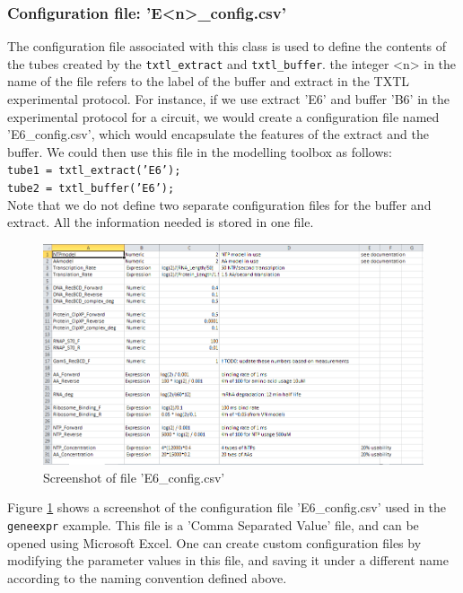 \documentclass[english]{report}
\begin{document}
		\subsubsection*{Configuration file: \textsf{'E<n>\_config.csv'}}
		The configuration file associated with this class is used to define the contents of the tubes created by the \texttt{txtl\_extract} and \texttt{txtl\_buffer}. the integer <n> in the name of the file refers to the label of the buffer and extract in the TXTL experimental protocol. For instance, if we use extract \textsf{'E6'} and buffer \textsf{'B6'} in the experimental protocol for a circuit, we would create a configuration file named \textsf{'E6\_config.csv'}, which would encapsulate the features of the extract and the buffer. We could then use this file in the modelling toolbox as follows: \\
		
		\noindent \texttt{tube1 = txtl\_extract('E6');} \\
		\texttt{tube2 = txtl\_buffer('E6');} \\
		
Note that we do not define two separate configuration files for the buffer and extract. All the information needed is stored in one file. \\

		\begin{figure}
		\begin{center}
		\includegraphics[width=\textwidth]{Config_E6_screenshot.png} 
		\caption{Screenshot of file 'E6\_config.csv'}
		\label{fig:reactionconfig}
		\end{center}
		\end{figure}

Figure \ref{fig:reactionconfig} shows a screenshot of the configuration file \textsf{'E6\_config.csv'} used in the \texttt{geneexpr} example. This file is a 'Comma Separated Value' file, and can be opened using Microsoft Excel. One can create custom configuration files by modifying the parameter values in this file, and saving it under a different name according to the naming convention defined above. 
\end{document}

